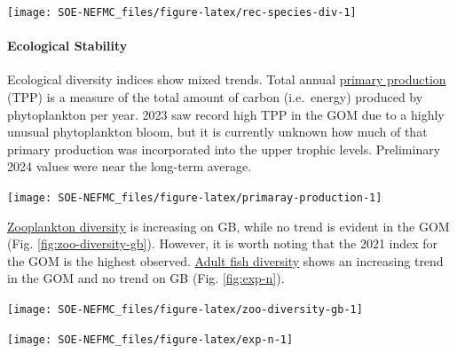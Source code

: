 \documentclass[
  10pt,
]{article}
\let\origfigure\figure
\let\endorigfigure\endfigure
\renewenvironment{figure}[1][2] {
    \expandafter\origfigure\expandafter[H]
} {
    \endorigfigure
}
\begin{document}
\begin{figure}

{\centering \texttt{[image: SOE-NEFMC\_files/figure-latex/rec-species-div-1]} 

}

\caption{Diversity of recreational catch in New England.}\label{fig:rec-species-div}
\end{figure}

\hypertarget{ecological-stability}{%
\paragraph{Ecological Stability}\label{ecological-stability}}

Ecological diversity indices show mixed trends. Total annual \href{https://noaa-edab.github.io/catalog/chl_pp.html}{primary production} (TPP) is a measure of the total amount of carbon (i.e.~energy) produced by phytoplankton per year. 2023 saw record high TPP in the GOM due to a highly unusual phytoplankton bloom, but it is currently unknown how much of that primary production was incorporated into the upper trophic levels. Preliminary 2024 values were near the long-term average.

\begin{figure}

{\centering \texttt{[image: SOE-NEFMC\_files/figure-latex/primaray-production-1]} 

}

\caption{Total areal annual primary production by ecological production unit. The dashed line represents the long-term (1998-2023) annual mean.}\label{fig:primaray-production}
\end{figure}

\href{https://noaa-edab.github.io/catalog/zoo_diversity.html}{Zooplankton diversity} is increasing on GB, while no trend is evident in the GOM (Fig. \ref{fig:zoo-diversity-gb}). However, it is worth noting that the 2021 index for the GOM is the highest observed. \href{https://noaa-edab.github.io/catalog/exp_n.html}{Adult fish diversity} shows an increasing trend in the GOM and no trend on GB (Fig. \ref{fig:exp-n}).

\begin{figure}

{\centering \texttt{[image: SOE-NEFMC\_files/figure-latex/zoo-diversity-gb-1]} 

}

\caption{Zooplankton diversity on Georges Bank and in the Gulf of Maine, based on Shannon diversity index. 2020 surveys were incomplete due to COVID-19.}\label{fig:zoo-diversity-gb}
\end{figure}
\begin{figure}

{\centering \texttt{[image: SOE-NEFMC\_files/figure-latex/exp-n-1]} 

}

\caption{Adult fish diversity for Georges Bank and in the Gulf of Maine, based on expected number of species in a standard number of individuals. Results from survey vessels Albatross and Bigelow are reported separately due to catchability differences.}\label{fig:exp-n}
\end{figure}
\end{document}
